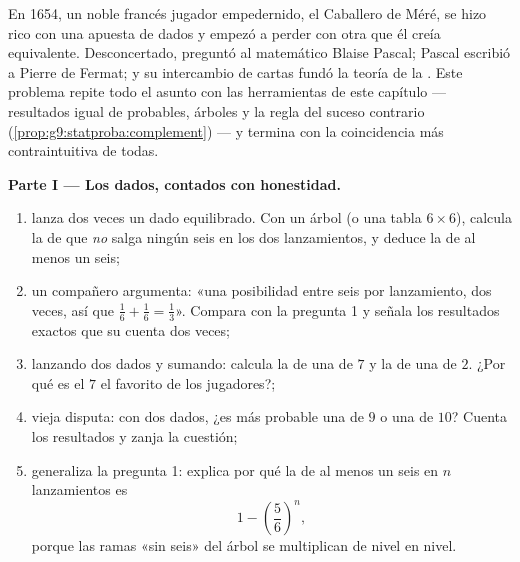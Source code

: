 \begin{problem}
\label{pb:g9:statproba:1}
En 1654, un noble francés jugador empedernido, el Caballero de
Méré, se hizo rico con una apuesta de dados y empezó a perder con otra
que él creía equivalente. Desconcertado, preguntó al matemático
Blaise Pascal; Pascal escribió a Pierre de Fermat; y su
intercambio de cartas fundó la teoría de la . Este
problema repite todo el asunto con las herramientas de este capítulo
--- resultados igual de probables, árboles y la regla del suceso contrario
(\cref{prop:g9:statproba:complement}) --- y termina con la coincidencia más
contraintuitiva de todas.

\medskip
\noindent\textbf{Parte I --- Los dados, contados con honestidad.}
\begin{enumerate}
  \item lanza dos veces un dado equilibrado. Con un árbol (o una
        tabla $6 \times 6$), calcula la  de que \emph{no} salga ningún seis en los
        dos lanzamientos, y deduce la  de al menos un
        seis;
  \item un compañero argumenta: «una posibilidad entre seis por lanzamiento, dos veces,
        así que $\frac16 + \frac16 = \frac13$». Compara con la pregunta
        1 y señala los resultados exactos que su  cuenta
        dos veces;
  \item lanzando dos dados y sumando: calcula la  de
        una  de $7$ y la de una  de $2$. ¿Por qué es el $7$ el
        favorito de los jugadores?;
  \item vieja disputa: con dos dados, ¿es más probable una  de $9$ o una  de
        $10$? Cuenta los resultados y zanja la cuestión;
  \item generaliza la pregunta 1: explica por qué la  de al
        menos un seis en $n$ lanzamientos es
        \[
        1 - \left(\frac56\right)^{\!n} ,
        \]
        porque las ramas «sin seis» del árbol se multiplican de nivel
        en nivel.
\end{enumerate}


\end{problem}
